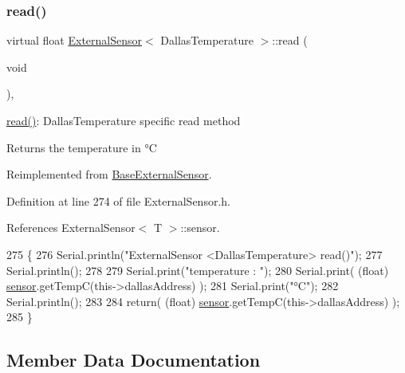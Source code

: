 \subsubsection{\texorpdfstring{read()}{read()}}
{\footnotesize\ttfamily virtual float \hyperlink{classExternalSensor}{External\+Sensor}$<$ Dallas\+Temperature $>$\+::read (\begin{DoxyParamCaption}\item[{void}]{ }\end{DoxyParamCaption})\hspace{0.3cm}{\ttfamily [inline]}, {\ttfamily [virtual]}}

\hyperlink{classExternalSensor_3_01DallasTemperature_01_4_a1e725d9338314515d4e5dc456ed6a6c8}{read()}\+: Dallas\+Temperature specific read method

\begin{DoxyReturn}{Returns}
the temperature in °C 
\end{DoxyReturn}


Reimplemented from \hyperlink{classBaseExternalSensor_a1564f16deacf57b51b9948ac29db4291}{Base\+External\+Sensor}.



Definition at line 274 of file External\+Sensor.\+h.



References External\+Sensor$<$ T $>$\+::sensor.


\begin{DoxyCode}
275     \{
276         Serial.println(\textcolor{stringliteral}{"ExternalSensor <DallasTemperature> read()"});
277         Serial.println();
278 
279         Serial.print(\textcolor{stringliteral}{"temperature : "});
280         Serial.print( (\textcolor{keywordtype}{float}) \hyperlink{classExternalSensor_3_01DallasTemperature_01_4_adb6ba4fcdedef95ad8f6b0c9b6c0f9d1}{sensor}.getTempC(this->dallasAddress) );
281         Serial.print(\textcolor{stringliteral}{"°C"});
282         Serial.println();
283         
284         \textcolor{keywordflow}{return}( (\textcolor{keywordtype}{float}) \hyperlink{classExternalSensor_3_01DallasTemperature_01_4_adb6ba4fcdedef95ad8f6b0c9b6c0f9d1}{sensor}.getTempC(this->dallasAddress) );
285     \}
\end{DoxyCode}


\subsection{Member Data Documentation}
\mbox{\label{classExternalSensor_3_01DallasTemperature_01_4_a7d9e9d2893e453638fcf440e5d8d9082}} 
